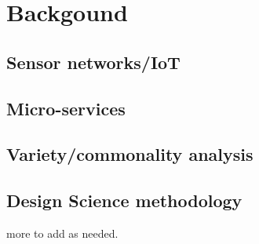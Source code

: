 \chapter{Backgound}
\section{Sensor networks/IoT}
\section{Micro-services}
\section{Variety/commonality analysis}
\section{Design Science methodology}
more to add as needed.
